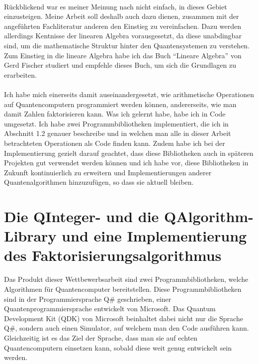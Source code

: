 \paragraph{}

Rückblickend war es meiner Meinung nach nicht einfach, in dieses Gebiet einzusteigen. Meine Arbeit soll deshalb auch dazu dienen, zusammen mit der angeführten Fachliteratur anderen den Einstieg zu vereinfachen. Dazu werden allerdings Kentnisse der linearen Algebra vorausgesetzt, da diese unabdingbar sind, um die mathematische Struktur hinter den Quantensystemen zu verstehen. Zum Einstieg in die lineare Algebra habe ich das Buch "`Lineare Algebra"' von Gerd Fischer \cite{LA} studiert und empfehle dieses Buch, um sich die Grundlagen zu erarbeiten.

\paragraph{}

Ich habe mich einerseits damit auseinandergesetzt, wie arithmetische Operationen auf Quantencomputern programmiert werden können, andererseits, wie man damit Zahlen faktorisieren kann. Was ich gelernt habe, habe ich in Code umgesetzt. Ich habe zwei Programmbibliotheken implementiert, die ich in Abschnitt 1.2 genauer beschreibe und in welchen man alle in dieser Arbeit betrachteten Operationen als Code finden kann.  Zudem habe ich bei der Implementierung gezielt darauf geachtet, dass diese Bibliotheken auch in späteren Projekten gut verwendet werden können und ich habe vor, diese Bibliotheken in Zukunft kontinuierlich zu erweitern und Implementierungen anderer Quantenalgorithmen hinzuzufügen, so dass sie aktuell bleiben. 

\section{Die QInteger- und die QAlgorithm-Library und eine Implementierung des Faktorisierungsalgorithmus}
Das Produkt dieser Wettbewerbsarbeit sind zwei Programmbibliotheken, welche Algorithmen für Quantencomputer bereitstellen. Diese Programmbibliotheken sind in der Programmiersprache Q\# geschrieben, einer Quantenprogrammiersprache entwickelt von Microsoft. Das Quantum Development Kit (QDK) von Microsoft beinhaltet dabei nicht nur die Sprache Q\#, sondern auch einen Simulator, auf welchem man den Code ausführen kann. Gleichzeitig ist es das Ziel der Sprache, dass man sie auf echten Quantencomputern einsetzen kann, sobald diese weit genug entwickelt sein werden.

